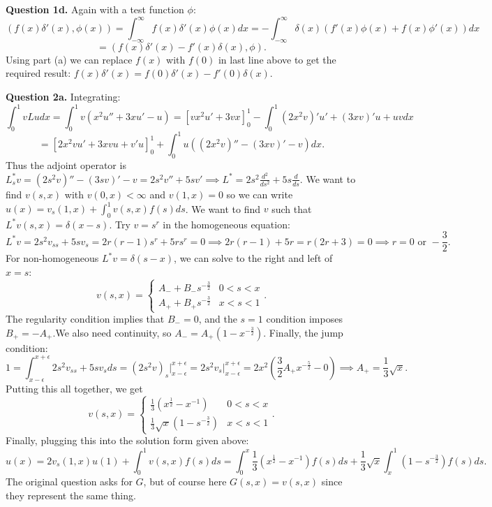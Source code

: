 \documentclass[letterpaper, reqno,11pt]{article}
\begin{document}
{\medskip\noindent\bf Question 1d.} Again with a test function $\phi$:
\[
  \left( f(x)\delta'(x),\phi(x) \right) =\int_{-\infty}^{\infty}f(x)\delta'(x)\phi(x)dx=-\int_{-\infty}^{\infty}\delta(x)(f'(x)\phi(x)+f(x)\phi'(x))dx
\]
\[
=(f(x)\delta'(x)-f'(x)\delta(x),\phi)
.\]
Using part (a) we can replace $f(x)$ with $f(0)$ in last line above to get the required result: $f(x)\delta'(x)=f(0)\delta'(x)-f'(0)\delta(x)$.

{\medskip\noindent\bf Question 2a.} Integrating:
\[
\int_{0}^{1}vLudx=\int_{0}^{1}v\left( x^2u''+3xu'-u \right)=\left[ vx^2u'+3vx \right]_0^{1}-\int_0^{1}(2x^2v)'u'+(3xv)'u+uvdx
\]
\[
    =\left[ 2x^2vu'+3xvu+v'u \right]_0^{1}+\int_0^1 u\left( (2x^2v)''-(3xv)'-v \right) dx
.\]
Thus the adjoint operator is $L_s^{*}v=(2s^2v)''-(3sv)'-v=2s^2v''+5sv'\implies L^{*}=2s^2 \frac{d^2}{ds^2}+5s \frac{d}{ds}$. We want to find $v(s,x)$ with $v(0,x)<\infty$ and $v(1,x)=0$ so we can write $u(x)=v_s(1,x)+\int_0^1v(s,x)f(s)ds$. We want to find $v$ such that $L^{*}v(s,x)=\delta(x-s)$. Try $v=s^{r}$ in the homogeneous equation:
\[
L^{*}v=2s^2v_{ss}+5sv_s=2r(r-1)s^{r}+5rs^{r}=0\implies 2r(r-1)+5r=r(2r+3)=0\implies r=0\text{ or }-\frac{3}{2}
.\]
For non-homogeneous $L^{*}v=\delta(s-x)$, we can solve to the right and left of $x=s$:
\[
v(s,x)=\begin{cases}
    A_-+B_-s^{-\frac{3}{2}}&0<s<x\\
    A_++B_+s^{-\frac{3}{2}}&x<s<1
\end{cases}
.\]
The regularity condition implies that $B_-=0$, and the $s=1$ condition imposes $B_+=-A_+$.We also need continuity, so $A_-=A_+(1-x^{-\frac{3}{2}})$. Finally, the jump condition:
\[
    1=\int_{x-\epsilon}^{x+\epsilon}2s^2v_{ss}+5sv_sds=(2s^2v)_s\big|_{x-\epsilon}^{x+\epsilon}=2s^2v_s\big|_{x-\epsilon}^{x+\epsilon}=2x^2\left(\frac{3}{2}A_+x^{-\frac{5}{2}}-0\right)\implies A_+=\frac{1}{3}\sqrt{x}
.\]
Putting this all together, we get
\[
v(s,x)=\begin{cases}
    \frac{1}{3}\left(x^{\frac{1}{2}}-x^{-1}\right)&0<s<x\\
    \frac{1}{3}\sqrt{x}\left( 1-s^{-\frac{3}{2}} \right)&x<s<1
\end{cases}
.\]
Finally, plugging this into the solution form given above:
\[
u(x)=2v_s(1,x)u(1)+\int_{0}^{1}v(s,x)f(s)ds=\int_{0}^{x}\frac{1}{3}\left(x^{\frac{1}{2}}-x^{-1}\right)f(s)ds+\frac{1}{3}\sqrt{x}\int_x^{1}\left(1-s^{-\frac{3}{2}}\right)f(s)ds
.\]
The original question asks for $G$, but of course here $G(s,x)=v(s,x)$ since they represent the same thing.
\end{document}
